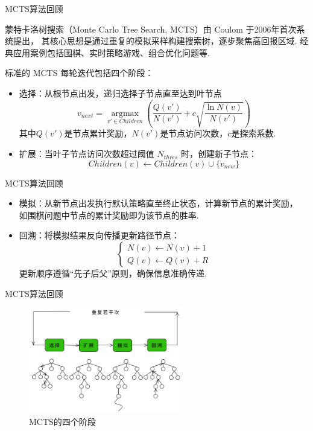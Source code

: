 \documentclass[12pt,aspectratio=169]{beamer}
\begin{document}
\begin{frame}{MCTS算法回顾}

  蒙特卡洛树搜索（Monte Carlo Tree Search, MCTS）由 Coulom 于2006年首次系统提出\cite{coulom2006efficient}，
  其核心思想是通过重复的模拟采样构建搜索树，逐步聚焦高回报区域.
  经典应用案例包括围棋、实时策略游戏、组合优化问题等. 
  
  标准的 MCTS 每轮迭代包括四个阶段：
  \begin{itemize}

    \item 选择：从根节点出发，递归选择子节点直至达到叶节点
    $$v_{next}=\mathop{\arg\max}\limits_{v'\in Children}
    \left(\frac{Q(v')}{N(v')}+c\sqrt{\frac{\ln N(v)}{N(v')}}\right)$$
    其中$Q(v')$是节点累计奖励，$N(v')$是节点访问次数，$c$是探索系数. 

    \item 扩展：当叶子节点访问次数超过阈值 $N_{thres}$ 时，创建新子节点：
    $$Children(v)\leftarrow Children(v)\cup\{v_{new}\}$$

  \end{itemize}

\end{frame}

\begin{frame}{MCTS算法回顾}

  \begin{itemize}

    \item 模拟：从新节点出发执行默认策略直至终止状态，计算新节点的累计奖励，
    如围棋问题中节点的累计奖励即为该节点的胜率. 

    \item 回溯：将模拟结果反向传播更新路径节点：
    $$\begin{cases}N(v)\leftarrow N(v)+1\\ Q(v)\leftarrow Q(v)+R\end{cases}$$
    更新顺序遵循“先子后父”原则，确保信息准确传递. 

  \end{itemize}

\end{frame}

\begin{frame}{MCTS算法回顾}

  \begin{figure}
    \begin{center}
      \includegraphics[width=0.6\textwidth]{fig/MCTS.png}
    \end{center}
    \caption{MCTS的四个阶段}\label{fig:1}
  \end{figure}

\end{frame}
\end{document}
